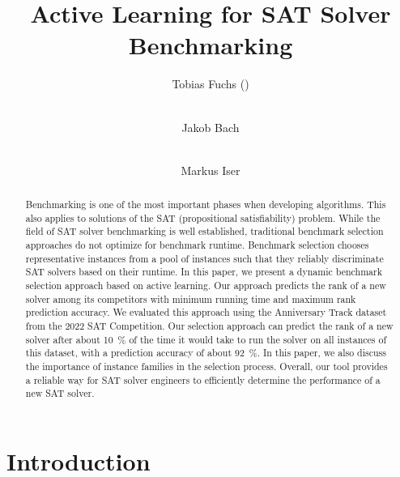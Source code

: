 \documentclass[runningheads]{llncs}
\begin{document}
\title{Active Learning for SAT Solver Benchmarking}

\author{
	Tobias Fuchs (\Letter) \and \\
	Jakob Bach \and \\
	Markus Iser
}



\maketitle

\begin{abstract}
  Benchmarking is one of the most important phases when developing algorithms.
  This also applies to solutions of the SAT (propositional satisfiability) problem.
  While the field of SAT solver benchmarking is well established, traditional benchmark selection approaches do not optimize for benchmark runtime.
  Benchmark selection chooses representative instances from a pool of instances such that they reliably discriminate SAT solvers based on their runtime.
  In this paper, we present a dynamic benchmark selection approach based on active learning.
  Our approach predicts the rank of a new solver among its competitors with minimum running time and maximum rank prediction accuracy.
  We evaluated this approach using the Anniversary Track dataset from the 2022 SAT Competition.
  Our selection approach can predict the rank of a new solver after about \SI{10}{\%} of the time it would take to run the solver on all instances of this dataset, with a prediction accuracy of about \SI{92}{\%}. 
  In this paper, we also discuss the importance of instance families in the selection process. 
  Overall, our tool provides a reliable way for SAT solver engineers to efficiently determine the performance of a new SAT solver.

\end{abstract}


\section{Introduction}
\label{sec:intro}
\end{document}

